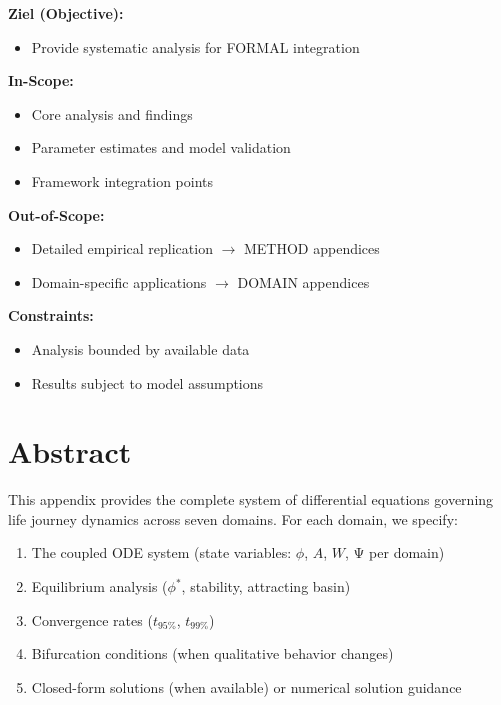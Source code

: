 \begin{tcolorbox}[
    colback=orange!5!white,
    colframe=orange!75!black,
    title={\textbf{Appendix Scope: Ziel / In-Scope / Out-of-Scope / Constraints}},
    fonttitle=\bfseries
]

\textbf{Ziel (Objective):}
\begin{itemize}[nosep]
    \item Provide systematic analysis for FORMAL integration
\end{itemize}

\textbf{In-Scope:}
\begin{itemize}[nosep]
    \item Core analysis and findings
    \item Parameter estimates and model validation
    \item Framework integration points
\end{itemize}

\textbf{Out-of-Scope:}
\begin{itemize}[nosep]
    \item Detailed empirical replication $\rightarrow$ METHOD appendices
    \item Domain-specific applications $\rightarrow$ DOMAIN appendices
\end{itemize}

\textbf{Constraints:}
\begin{itemize}[nosep]
    \item Analysis bounded by available data
    \item Results subject to model assumptions
\end{itemize}

\end{tcolorbox}


\section*{Abstract}

This appendix provides the complete system of differential equations governing life journey dynamics across seven domains. For each domain, we specify:
\begin{enumerate}[nosep]
\item The coupled ODE system (state variables: $\phi$, $A$, $W$, Ψ per domain)
\item Equilibrium analysis ($\phi^*$, stability, attracting basin)
\item Convergence rates ($t_{95\%}$, $t_{99\%}$)
\item Bifurcation conditions (when qualitative behavior changes)
\item Closed-form solutions (when available) or numerical solution guidance
\end{enumerate}

